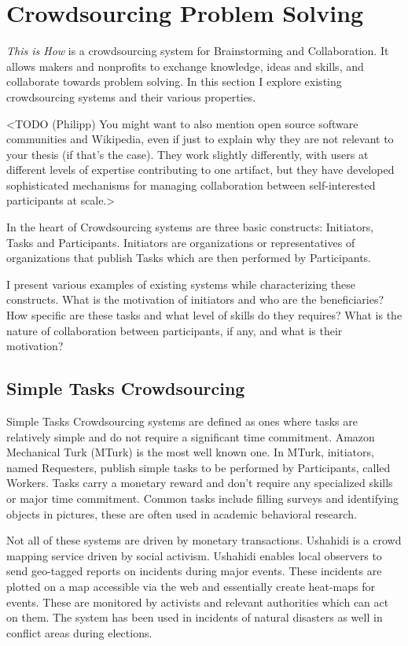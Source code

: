 \section{Crowdsourcing Problem Solving}

\textit{This is How} is a crowdsourcing system for Brainstorming and Collaboration. It allows makers and nonprofits to exchange knowledge, ideas and skills, and collaborate towards problem solving. In this section I explore existing crowdsourcing systems and their various properties.

<TODO (Philipp) You might want to also mention open source software communities and Wikipedia, even if just to explain why they are not relevant to your thesis (if that’s the case). They work slightly differently, with users at different levels of expertise contributing to one artifact, but they have developed sophisticated mechanisms for managing collaboration between self-interested participants at scale.>

In the heart of Crowdsourcing systems are three basic constructs: Initiators, Tasks and Participants. Initiators are organizations or representatives of organizations that publish Tasks which are then performed by Participants. 

I present various examples of existing systems while characterizing these constructs. What is the motivation of initiators and who are the beneficiaries? How specific are these tasks and what level of skills do they requires? What is the nature of collaboration between participants, if any, and what is their motivation?

\subsection{Simple Tasks Crowdsourcing}

Simple Tasks Crowdsourcing systems are defined as ones where tasks are relatively simple and do not require a significant time commitment. Amazon Mechanical Turk (MTurk) \cite{mturk} is the most well known one. In MTurk, initiators, named Requesters, publish simple tasks to be performed by Participants, called Workers. Tasks carry a monetary reward and don't require any specialized skills or major time commitment. Common tasks include filling surveys and  identifying objects in pictures, these are often used in academic behavioral research.  

Not all of these systems are driven by monetary transactions. Ushahidi is a crowd mapping service driven by social activism\cite{ushahidi}. Ushahidi enables local observers to send geo-tagged reports on incidents during major events. These incidents are plotted on a map accessible via the web and essentially create heat-maps for events. These are monitored by activists and relevant authorities which can act on them. The system has been used in incidents of natural disasters as well in conflict areas during elections. 

